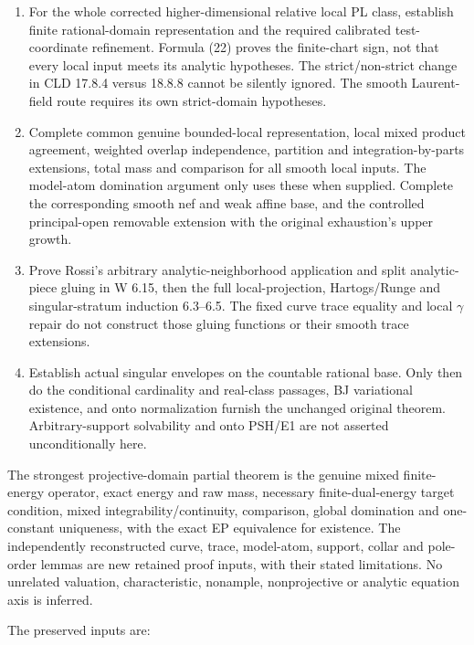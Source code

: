 \documentclass[
  11pt,
]{article}
\providecommand{\tightlist}{%
  \setlength{\itemsep}{0pt}\setlength{\parskip}{0pt}}
\begin{document}
\begin{enumerate}
\def\labelenumi{\arabic{enumi}.}
\tightlist
\item
  For the whole corrected higher-dimensional relative local PL class,
  establish finite rational-domain representation and the required
  calibrated test-coordinate refinement. Formula (22) proves the
  finite-chart sign, not that every local input meets its analytic
  hypotheses. The strict/non-strict change in CLD 17.8.4 versus 18.8.8
  cannot be silently ignored. The smooth Laurent-field route requires
  its own strict-domain hypotheses.
\item
  Complete common genuine bounded-local representation, local mixed
  product agreement, weighted overlap independence, partition and
  integration-by-parts extensions, total mass and comparison for all
  smooth local inputs. The model-atom domination argument only uses
  these when supplied. Complete the corresponding smooth nef and weak
  affine base, and the controlled principal-open removable extension
  with the original exhaustion's upper growth.
\item
  Prove Rossi's arbitrary analytic-neighborhood application and split
  analytic-piece gluing in W 6.15, then the full local-projection,
  Hartogs/Runge and singular-stratum induction 6.3--6.5. The fixed curve
  trace equality and local \(\gamma\) repair do not construct those
  gluing functions or their smooth trace extensions.
\item
  Establish actual singular envelopes on the countable rational base.
  Only then do the conditional cardinality and real-class passages, BJ
  variational existence, and onto normalization furnish the unchanged
  original theorem. Arbitrary-support solvability and onto PSH/E1 are
  not asserted unconditionally here.
\end{enumerate}

The strongest projective-domain partial theorem is the genuine mixed
finite-energy operator, exact energy and raw mass, necessary
finite-dual-energy target condition, mixed integrability/continuity,
comparison, global domination and one-constant uniqueness, with the
exact EP equivalence for existence. The independently reconstructed
curve, trace, model-atom, support, collar and pole-order lemmas are new
retained proof inputs, with their stated limitations. No unrelated
valuation, characteristic, nonample, nonprojective or analytic equation
axis is inferred.

The preserved inputs are:
\end{document}
